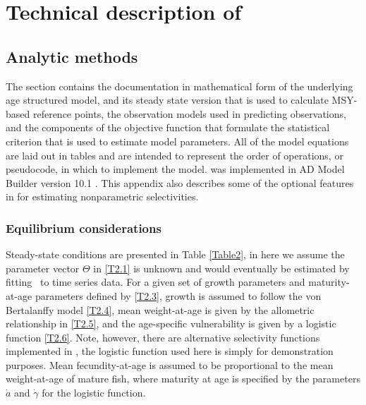 \section{Technical description of \iscam}\label{appiSCAM}
	\subsection{Analytic methods}
	The section contains the documentation in mathematical form of the underlying age structured model, and its steady state version that is used to calculate MSY-based reference points, the observation models used in predicting observations, and the components of the objective function that formulate the statistical criterion that is used to estimate model parameters. All of the model equations are laid out in tables and are intended to represent the order of operations, or pseudocode, in which to implement the model. \iscam was implemented in AD Model Builder version 10.1 \cite{ADMB2009}.  This appendix also describes some of the optional features in \iscam for estimating nonparametric selectivities.

\subsubsection{Equilibrium considerations}

Steady-state conditions are presented in Table \ref{Table2}, in here we assume the parameter vector $\Theta$ in \eqref{T2.1} is unknown and would eventually be estimated by fitting \iscam\ to time series data.  For a given set of growth parameters and maturity-at-age parameters defined by \eqref{T2.3}, growth is assumed to follow the von Bertalanffy model \eqref{T2.4}, mean weight-at-age is given by the allometric relationship in \eqref{T2.5}, and the age-specific vulnerability is given by a logistic function \eqref{T2.6}.  Note, however, there are alternative selectivity functions implemented in \iscam, the logistic function used here is simply for demonstration purposes.  Mean fecundity-at-age is assumed to be proportional to the mean weight-at-age of mature fish, where maturity at age is specified by the parameters $\dot{a}$ and $\dot{\gamma}$ for the logistic function.

 

